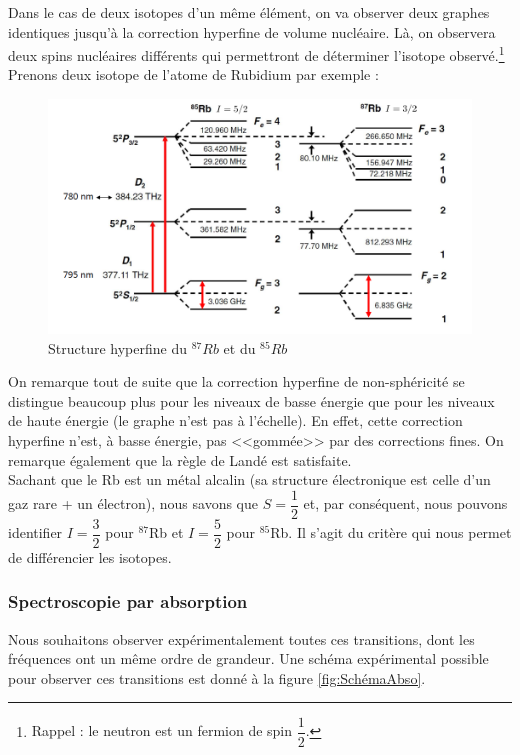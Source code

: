 Dans le cas de deux isotopes d'un même élément, on va observer deux graphes identiques jusqu'à la correction hyperfine de volume nucléaire. Là, on observera deux spins nucléaires différents qui permettront de déterminer l'isotope observé.\footnote{Rappel : le neutron est un fermion de spin $\dfrac{1}{2}$.} Prenons deux isotope de l'atome de Rubidium par exemple :
\begin{figure}[tph]
    \centering
    \includegraphics[scale=0.8]{Images2/ComparaisonRb.PNG}
    \caption{Structure hyperfine du $^{87}Rb$ et du $^{85}Rb$}
\label{eq:struct_hyperfine}
\end{figure}
On remarque tout de suite que la correction hyperfine de non-sphéricité se distingue beaucoup plus pour les niveaux de basse énergie que pour les niveaux de haute énergie (le graphe n'est pas à l'échelle). En effet, cette correction hyperfine n'est, à basse énergie, pas <<gommée>> par des corrections fines. On remarque également que la règle de Landé est satisfaite.\\
Sachant que le Rb est un métal alcalin (sa structure électronique est celle d'un gaz rare + un électron), nous savons que $S = \dfrac{1}{2}$ et, par conséquent, nous pouvons identifier $I = \dfrac{3}{2}$ pour $^{87}$Rb et $I = \dfrac{5}{2}$ pour $^{85}$Rb. Il s'agit du critère qui nous permet de différencier les isotopes.



\subsubsection{Spectroscopie par absorption}


Nous souhaitons observer expérimentalement toutes ces transitions, dont les fréquences ont un même ordre de grandeur. Une schéma expérimental possible pour observer ces transitions est donné à la figure \ref{fig:SchémaAbso}.

